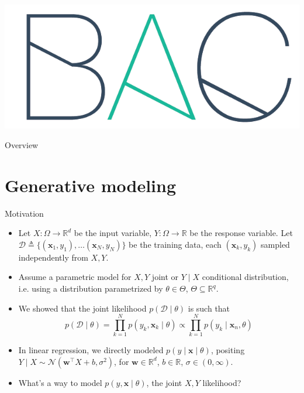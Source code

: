 \documentclass{beamer}
\title[\lecturetitle]{\lecturetitle}
\author[Derek Huang (BAC Advanced Team)]{Derek Huang}
\institute{BAC Advanced Team}
\date{April 20, 2021}
\numberwithin{equation}{section}
\begin{document}
\begin{frame}
    \titlepage
    \centering
    \includegraphics[scale = 0.1]{../bac_logo1.png}
\end{frame}

\begin{frame}{Overview}
    \tableofcontents
\end{frame}

\section{Generative modeling}

\begin{frame}{Motivation}
    \begin{itemize}
        \item
        Let $ X : \Omega \rightarrow \mathbb{R}^d $ be the input variable,
        $ Y : \Omega \rightarrow \mathbb{R} $ be the response variable. Let
        $ \mathcal{D} \triangleq \{(\mathbf{x}_1, y_1), \ldots
        (\mathbf{x}_N, y_N)\} $ be the training data, each $ (\mathbf{x}_k,
        y_k) $ sampled independently from $ X, Y $.

        \item
        Assume a parametric model for $ X, Y $ joint or $ Y \mid X $
        conditional distribution, i.e. using a distribution parametrized by
        $ \theta \in \Theta $, $ \Theta \subseteq \mathbb{R}^q $.

        \item
        We showed that the joint likelihood $ p(\mathcal{D} \mid \theta) $
        is such that
        \begin{equation*}
            p(\mathcal{D} \mid \theta) =
            \prod_{k = 1}^Np(y_k, \mathbf{x}_k \mid \theta) \propto
            \prod_{k = 1}^Np(y_k \mid \mathbf{x}_n, \theta)
        \end{equation*}

        \item
        In linear regression, we directly modeled $ p(y \mid \mathbf{x} \mid
        \theta) $, positing $ Y \mid X \sim \mathcal{N}(\mathbf{w}^\top X + b,
        \sigma^2) $, for $ \mathbf{w} \in \mathbb{R}^d $,
        $ b \in \mathbb{R} $, $ \sigma \in (0, \infty) $.

        \item
        What's a way to model $ p(y, \mathbf{x} \mid \theta) $, the joint
        $ X, Y $ likelihood?
    \end{itemize}
\end{frame}
\end{document}

